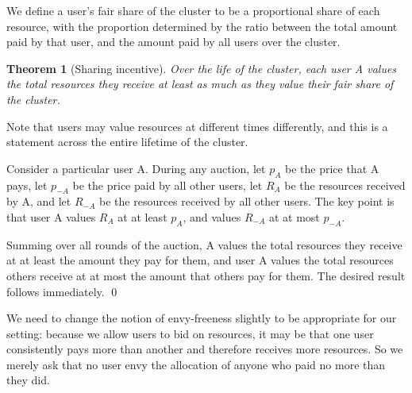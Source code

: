 \documentclass{acm_proc_article-sp}
\newtheorem{theorem}{Theorem}[section]
\newenvironment{pproof}[1][Proof]{\begin{trivlist}
\item[\hskip \labelsep {\bfseries #1}]}{\end{trivlist}}
\begin{document}
We define a user's fair share of the cluster to be a proportional share of each resource, with the proportion determined by the ratio between the total amount paid by that user, and the amount paid by all users over the cluster. 
\vspace{-5mm}
\begin{theorem}[Sharing incentive]
Over the life of the cluster, each user A values the total resources they receive at least as much as they value their fair share of the cluster. 
\end{theorem}
\vspace{-5mm}
Note that users may value resources at different times differently, and this is a statement across the entire lifetime of the cluster.
\vspace{-5mm}
\begin{pproof}
Consider a particular user A. 
During any auction, let $p_A$ be the price that A pays, let $p_{-A}$ be the price paid by all other users, let $R_A$ be the resources received by A, 
and let $R_{-A}$ be the resources received by all other users. The key point is that user A values $R_A$ at at least $p_A$, and values $R_{-A}$ at at most $p_{-A}$. 

Summing over all rounds of the auction, A values the total resources they receive at at least the amount they pay for them, 
and user A values the total resources others receive at at most the amount that others pay for them. The desired result follows immediately. \qed
\end{pproof}

We need to change the notion of envy-freeness slightly to be appropriate for our setting: 
because we allow users to bid on resources, it may be that one user consistently pays more than another and therefore receives more resources. 
So we merely ask that no user envy the allocation of anyone who paid no more than they did.
\end{document}

